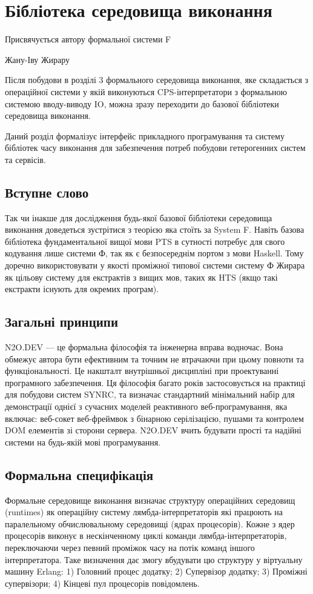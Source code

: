 \chapter{Бібліотека середовища виконання}
\epigraph{Присвячується автору формальної системи F}{Жану-Іву Жирару}

Після побудови в розділі 3 формального середовища виконання,
яке складається з операційної системи у якій виконуються
CPS-інтерпретатори з формальною системою вводу-виводу IO, можна зразу
переходити до базової бібліотеки середовища виконання.

Даний розділ формалізує інтерфейс прикладного програмування та систему
бібліотек часу виконання для забезпечення потреб побудови гетерогенних систем та сервісів.

\section*{Вступне слово}
Так чи інакше для дослідження будь-якої базової бібліотеки середовища
виконання доведеться зустрітися з теорією яка стоїть за System F.
Навіть базова бібліотека фундаментальної вищої мови PTS в сутності
потребує для свого кодування лише системи Ф, так як є безпосереднім
портом з мови Haskell. Тому доречно використовувати у якості проміжної
типової системи систему Ф Жирара як цільову систему для
екстрактів з вищих мов, таких як HTS (якщо такі екстракти існують для окремих програм).

\section{Загальні принципи}
N2O.DEV — це формальна філософія та інженерна вправа водночас.
Вона обмежує автора бути ефективним та точним не втрачаючи
при цьому повноти та функціональності. Це накшталт внутрішньої
дисципліні при проектуванні програмного забезпечення. Ця філософія
багато років застосовується на практиці для побудови систем SYNRC,
та визначає стандартний мінімальний набір для демонстрації однієї
з сучасних моделей реактивного веб-програмування, яка включає: веб-сокет
веб-фреймвок з бінарною серілізацією, пушами та контролем DOM елементів
зі сторони сервера. N2O.DEV вчить будувати прості та надійні системи
на будь-якій мові програмування.

\section{Формальна специфікація}
Формальне середовище виконання визначає структуру операційних середовищ (runtimes) як
операційну систему лямбда-інтерпретаторів які працюють на паралельному
обчислювальному середовищі (ядрах процесорів). Кожне з ядер процесорів
виконує в нескінченному циклі команди лямбда-інтерпретаторів, переключаючи
через певний проміжок часу на потік команд іншого інтерпретатора. Таке
визначення дає змогу вбудувати цю структуру у віртуальну машину Erlang:
1) Головний процес додатку; 2) Супервізор додатку; 3) Проміжні
супервізори; 4) Кінцеві пул процесорів повідомлень.

